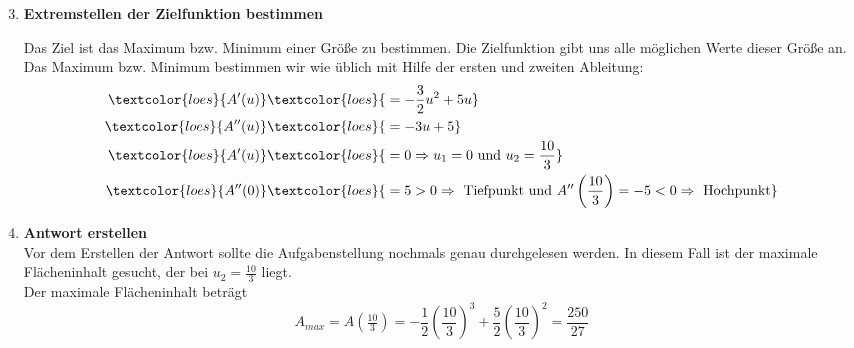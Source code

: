 \begin{enumerate}
	\setcounter{enumi}{2}
	\item \textbf{Extremstellen der Zielfunktion bestimmen}

	\textcolor{loes}{Das Ziel ist das Maximum bzw. Minimum einer Größe zu bestimmen. Die Zielfunktion gibt uns alle möglichen Werte dieser Größe an. Das Maximum bzw. Minimum bestimmen wir wie üblich mit Hilfe der ersten und zweiten Ableitung:}
    \begin{align*}
	   \textcolor{loes}{A'(u)}&\textcolor{loes}{\;=-\frac{3}{2}u^2+5u}\\
	   \textcolor{loes}{A''(u)}&\textcolor{loes}{\;=-3u+5}\\
	   \textcolor{loes}{A'(u)}&\textcolor{loes}{\;=0\Rightarrow u_1=0\text{ und }u_2=\frac{10}{3}}\\
	   \textcolor{loes}{A''(0)}&\textcolor{loes}{\;=5>0\Rightarrow\text{ Tiefpunkt und }A''\left(\frac{10}{3}\right)=-5<0\Rightarrow\text{ Hochpunkt}}
    \end{align*}

	\item \textbf{Antwort erstellen}\\
	\textcolor{loes}{Vor dem Erstellen der Antwort sollte die Aufgabenstellung nochmals genau durchgelesen werden. In diesem Fall ist der maximale Flächeninhalt gesucht, der bei \(u_2=\frac{10}{3}\) liegt.}\\
	\textcolor{loes}{Der maximale Flächeninhalt beträgt}\\
	\textcolor{loes}{\[A_{max}=A\left(\tfrac{10}{3}\right)=-\frac{1}{2}\left(\frac{10}{3}\right)^3+\frac{5}{2}\left(\frac{10}{3}\right)^2=\frac{250}{27}\]}
\end{enumerate}

